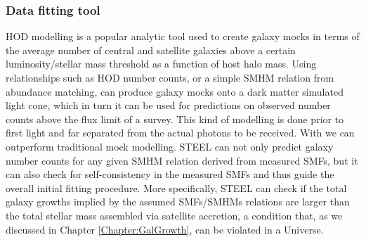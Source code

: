 \subsubsection{Data fitting tool}

HOD modelling is a popular analytic tool used to create galaxy mocks in terms of the average number of central and satellite galaxies above a certain luminosity/stellar mass threshold as a function of host halo mass. Using relationships such as HOD number counts, or a simple SMHM relation from abundance matching, can produce galaxy mocks onto a dark matter simulated light cone, which in turn it can be used for predictions on observed number counts above the flux limit of a survey. This kind of modelling is done prior to first light and far separated from the actual photons to be received. With \steel we can outperform traditional mock modelling. STEEL can not only predict galaxy number counts for any given SMHM relation derived from measured SMFs, but it can also check for self-consistency in the measured SMFs and thus guide the overall initial fitting procedure. More specifically, STEEL can check if the total galaxy growths implied by the assumed SMFs/SMHMs relations are larger than the total stellar mass assembled via satellite accretion, a condition that, as we discussed in Chapter \ref{Chapter:GalGrowth}, can be violated in a \LCDM Universe.

